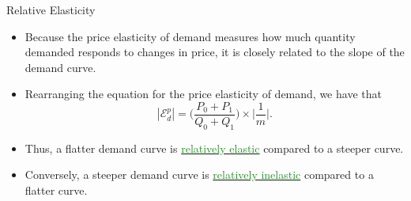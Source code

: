 \documentclass[xcolor={dvipsnames},pdf, hyperref={colorlinks=true, citecolor=ForestGreen, linkcolor=BlueViolet, urlcolor=Magenta}]{beamer}
\newcommand{\dd}[1]{{\underline{\textcolor{ForestGreen}{#1}}}}
\begin{document}
\begin{frame}{Relative Elasticity}
	
\begin{itemize}
	\item 	Because the price elasticity of demand measures how much quantity demanded responds to changes in price, it is closely related to the slope of the demand curve. 
	\item Rearranging the equation for the price elasticity of demand, we have that
		\begin{equation*}
		|\mathcal{E}_d^p|= \Big(\frac{P_0 + P_1}{Q_0 + Q_1}\Big) \times \Big|\frac{1}{m}\Big|.
		\end{equation*}
	\item Thus, a flatter demand curve is \dd{relatively elastic} compared to a steeper curve. 
	\item Conversely, a steeper demand curve is  \dd{relatively inelastic} compared to a flatter curve.
\end{itemize}
		
\end{frame}
\end{document}
